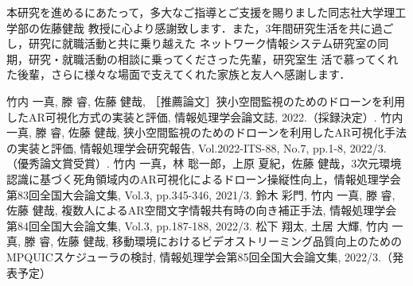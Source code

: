 \documentclass[a4paper,11pt]{ujreport}
\begin{document}
本研究を進めるにあたって，多大なご指導とご支援を賜りました同志社大学理工学部の佐藤健哉
教授に心より感謝致します．また，3年間研究生活を共に過ごし，研究に就職活動と共に乗り越えた
ネットワーク情報システム研究室の同期，研究・就職活動の相談に乗ってくださった先輩，研究室生
活で慕ってくれた後輩，さらに様々な場面で支えてくれた家族と友人へ感謝します．
\clearpage


\renewcommand{\bibname}{参考文献}






\clearpage

\renewcommand{\bibname}{研究業績}


\begin{thebibliography}{99}
  \bibitem{} 竹内 一真, 滕 睿, 佐藤 健哉, ［推薦論文］狭小空間監視のためのドローンを利用したAR可視化方式の実装と評価, 情報処理学会論文誌, 2022.（採録決定）.
  \bibitem{} 竹内 一真, 滕 睿, 佐藤 健哉, 狭小空間監視のためのドローンを利用したAR可視化手法の実装と評価, 情報処理学会研究報告, Vol.2022-ITS-88, No.7, pp.1-8, 2022/3.（優秀論文賞受賞）.
  \bibitem{} 竹内 一真，林 聡一郎，上原 夏紀，佐藤 健哉，3次元環境認識に基づく死角領域内のAR可視化によるドローン操縦性向上，情報処理学会第83回全国大会論文集, Vol.3, pp.345-346, 2021/3.
  \bibitem{} 鈴木 彩門, 竹内 一真, 滕 睿, 佐藤 健哉, 複数人によるAR空間文字情報共有時の向き補正手法, 情報処理学会第84回全国大会論文集, Vol.3, pp.187-188, 2022/3.
  \bibitem{} 松下 翔太, 土居 大輝, 竹内 一真, 滕 睿, 佐藤 健哉, 移動環境におけるビデオストリーミング品質向上のためのMPQUICスケジューラの検討, 情報処理学会第85回全国大会論文集, 2022/3.（発表予定）
\end{thebibliography}

\clearpage

\end{document}
